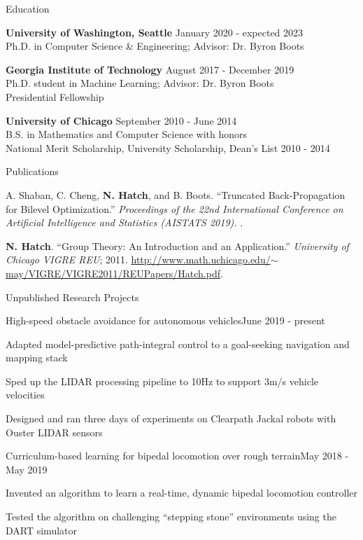 \documentclass{resume} %
\begin{document}
\begin{rSection}{Education}

{\bf University of Washington, Seattle} \hfill {January 2020 - expected 2023} \\
Ph.D. in Computer Science \& Engineering; Advisor: Dr. Byron Boots

{\bf Georgia Institute of Technology} \hfill {August 2017 - December 2019} \\
Ph.D. student in Machine Learning; Advisor: Dr. Byron Boots \\
Presidential Fellowship

{\bf University of Chicago} \hfill {September 2010 - June 2014} \\
B.S. in Mathematics and Computer Science with honors \\
National Merit Scholarship, University Scholarship, Dean's List 2010 - 2014

\end{rSection}

\begin{rSection}{Publications}

A. Shaban, C. Cheng, {\bf N. Hatch}, and B. Boots. ``Truncated Back-Propagation for Bilevel Optimization.''
{\em Proceedings of the 22nd International Conference on Artificial Intelligence and Statistics (AISTATS 2019).}
.

{\bf N. Hatch}. ``Group Theory: An Introduction and an Application.'' {\em University of Chicago VIGRE REU}; 2011.
\href{http://www.math.uchicago.edu/~may/VIGRE/VIGRE2011/REUPapers/Hatch.pdf}{http://www.math.uchicago.edu/$\sim$may/VIGRE/VIGRE2011/REUPapers/Hatch.pdf}.

\end{rSection}

\begin{rSection}{Unpublished Research Projects}
\begin{rProject}{High-speed obstacle avoidance for autonomous vehicles}{June 2019 - present}
\item Adapted model-predictive path-integral control to a goal-seeking navigation and mapping stack
\item Sped up the LIDAR processing pipeline to 10Hz to support 3m/s vehicle velocities
\item Designed and ran three days of experiments on Clearpath Jackal robots with Ouster LIDAR sensors
\end{rProject}
\begin{rProject}{Curriculum-based learning for bipedal locomotion over rough terrain}{May 2018 - May 2019}
\item Invented an algorithm to learn a real-time, dynamic bipedal locomotion controller
\item Tested the algorithm on challenging ``stepping stone'' environments using the DART simulator
\end{rProject}
\end{rSection}
\end{document}
